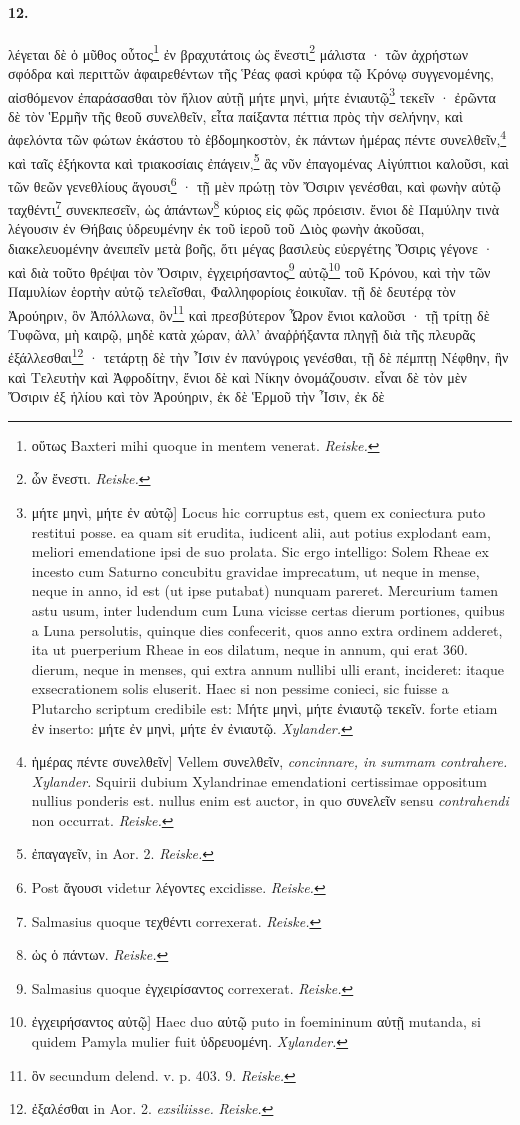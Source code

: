 \documentclass[a4paper, 11pt, oneside, polutonikogreek, german, landscape]{article}
\begin{document}
\paragraph{12.}
λέγεται δὲ ὁ μῦθος οὗτος\footnote{οὕτως Baxteri mihi quoque in mentem venerat. \emph{Reiske.}} ἐν βραχυτάτοις ὡς ἔνεστι\footnote{ὧν ἔνεστι. \emph{Reiske.}} μάλιστα · τῶν ἀχρήστων σφόδρα καὶ περιττῶν ἀφαιρεθέντων τῆς Ῥέας φασὶ κρύφα τῷ Κρόνῳ συγγενομένης, αἰσθόμενον ἐπαράσασθαι τὸν ἥλιον αὐτῇ μήτε μηνὶ, μήτε ἐνιαυτῷ\footnote{μήτε μηνὶ, μήτε ἐν αὐτῷ] Locus hic corruptus est, quem ex coniectura puto restitui posse. ea quam sit erudita, iudicent alii, aut potius explodant eam, meliori emendatione ipsi de suo prolata. Sic ergo intelligo: Solem Rheae ex incesto cum Saturno concubitu gravidae imprecatum, ut neque in mense, neque in anno, id est (ut ipse putabat) nunquam pareret. Mercurium tamen astu usum, inter ludendum cum Luna vicisse certas dierum portiones, quibus a Luna persolutis, quinque dies confecerit, quos anno extra ordinem adderet, ita ut puerperium Rheae in eos dilatum, neque in annum, qui erat 360. dierum, neque in menses, qui extra annum nullibi ulli erant, incideret: itaque exsecrationem solis eluserit. Haec si non pessime conieci, sic fuisse a Plutarcho scriptum credibile est: Μήτε μηνὶ, μήτε ἐνιαυτῷ τεκεῖν. forte etiam ἐν inserto: μήτε ἐν μηνὶ, μήτε ἐν ἐνιαυτῷ. \emph{Xylander.}} τεκεῖν · ἐρῶντα δὲ τὸν Ἑρμῆν τῆς θεοῦ συνελθεῖν, εἶτα παίξαντα πέττια πρὸς τὴν σελήνην, καὶ ἀφελόντα τῶν φώτων ἑκάστου τὸ ἑβδομηκοστὸν, ἐκ πάντων ἡμέρας πέντε συνελθεῖν,\footnote{ἡμέρας πέντε συνελθεῖν] Vellem συνελθεῖν, \emph{concinnare, in summam contrahere.} \emph{Xylander.} Squirii dubium Xylandrinae emendationi certissimae oppositum nullius ponderis est. nullus enim est auctor, in quo συνελεῖν sensu \emph{contrahendi} non occurrat. \emph{Reiske.}} καὶ ταῖς ἑξήκοντα καὶ τριακοσίαις ἐπάγειν,\footnote{ἐπαγαγεῖν, in Aor. 2. \emph{Reiske.}} ἃς νῦν ἐπαγομένας Αἰγύπτιοι καλοῦσι, καὶ τῶν θεῶν γενεθλίους ἄγουσι\footnote{Post ἄγουσι videtur λέγοντες excidisse. \emph{Reiske.}} · τῇ μὲν πρώτῃ τὸν Ὄσιριν γενέσθαι, καὶ φωνὴν αὐτῷ ταχθέντι\footnote{Salmasius quoque τεχθέντι correxerat. \emph{Reiske.}} συνεκπεσεῖν, ὡς ἁπάντων\footnote{ὡς ὁ πάντων. \emph{Reiske.}} κύριος εἰς φῶς πρόεισιν. ἔνιοι δὲ Παμύλην τινὰ λέγουσιν ἐν Θήβαις ὑδρευμένην ἐκ τοῦ ἱεροῦ τοῦ Διὸς φωνὴν ἀκοῦσαι, διακελευομένην ἀνειπεῖν μετὰ βοῆς, ὅτι μέγας βασιλεὺς εὐεργέτης Ὄσιρις γέγονε · καὶ διὰ τοῦτο θρέψαι τὸν Ὄσιριν, ἐγχειρήσαντος\footnote{Salmasius quoque ἐγχειρίσαντος correxerat. \emph{Reiske.}} αὐτῷ\footnote{ἐγχειρήσαντος αὐτῷ] Haec duo αὐτῷ puto in foemininum αὐτῇ mutanda, si quidem Pamyla mulier fuit ὑδρευομένη. \emph{Xylander.}} τοῦ Κρόνου, καὶ τὴν τῶν Παμυλίων ἑορτὴν αὐτῷ τελεῖσθαι, Φαλληφορίοις ἐοικυῖαν. τῇ δὲ δευτέρᾳ τὸν Ἀρούηριν, ὃν Ἀπόλλωνα, ὃν\footnote{ὃν secundum delend. v. p. 403. 9. \emph{Reiske.}} καὶ πρεσβύτερον Ὧρον ἔνιοι καλοῦσι · τῇ τρίτῃ δὲ Τυφῶνα, μὴ καιρῷ, μηδὲ κατὰ χώραν, ἀλλ' ἀναῤῥήξαντα πληγῇ διὰ τῆς πλευρᾶς ἐξάλλεσθαι\footnote{ἐξαλέσθαι in Aor. 2. \emph{exsiliisse.} \emph{Reiske.}} · τετάρτῃ δὲ τὴν Ἶσιν ἐν πανύγροις γενέσθαι, τῇ δὲ πέμπτῃ Νέφθην, ἣν καὶ Τελευτὴν καὶ Ἀφροδίτην, ἔνιοι δὲ καὶ Νίκην ὀνομάζουσιν. εἶναι δὲ τὸν μὲν Ὄσιριν ἐξ ἡλίου καὶ τὸν Ἀρούηριν, ἐκ δὲ Ἑρμοῦ τὴν Ἶσιν, ἐκ δὲ 
\end{document}

